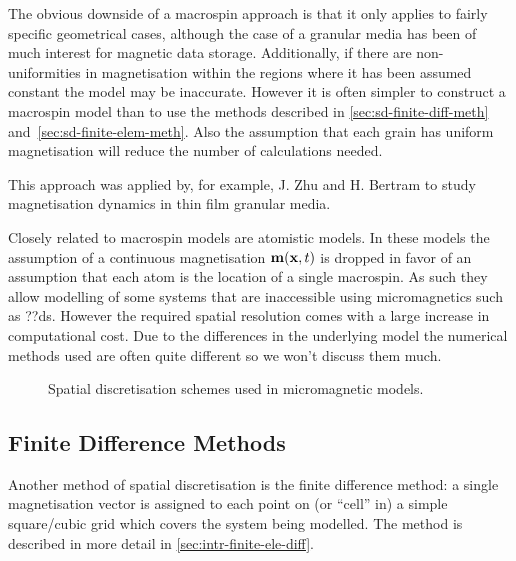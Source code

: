 The obvious downside of a macrospin approach is that it only applies to fairly specific geometrical cases, although the case of a granular media has been of much interest for magnetic data storage. Additionally, if there are non-uniformities in magnetisation within the regions where it has been assumed constant the model may be inaccurate. However it is often simpler to construct a macrospin model than to use the methods described in \autoref{sec:sd-finite-diff-meth} and~\ref{sec:sd-finite-elem-meth}. Also the assumption that each grain has uniform magnetisation will reduce the number of calculations needed.

This approach was applied by, for example, J. Zhu and H. Bertram to study magnetisation dynamics in thin film granular media.\cite{Zhu1988}

Closely related to macrospin models are atomistic models\cite{Evans2014}.
In these models the assumption of a continuous magnetisation $\mathbf{m}(\mathbf{x}, t)$ is dropped in favor of an assumption that each atom is the location of a single macrospin.
As such they allow modelling of some systems that are inaccessible using micromagnetics such as ??ds.
However the required spatial resolution comes with a large increase in computational cost.
Due to the differences in the underlying model the numerical methods used are often quite different so we won't discuss them much.

\begin{figure}[\figpos]
  \centering
  \caption{Spatial discretisation schemes used in micromagnetic models.}
  \label{fig:types-spat-discl}
\end{figure}


\subsection{Finite Difference Methods}
\label{sec:sd-finite-diff-meth}

Another method of spatial discretisation is the finite difference method: a single magnetisation vector is assigned to each point on (or ``cell'' in) a simple square/cubic grid which covers the system being modelled. The method is described in more detail in \autoref{sec:intr-finite-ele-diff}.

